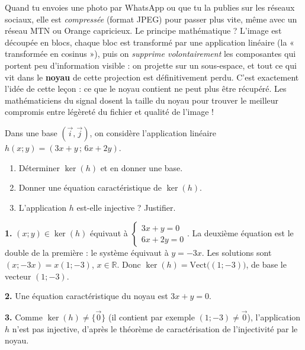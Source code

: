 \documentclass[11pt]{article}
\begin{document}
\begin{savaistu}
Quand tu envoies une photo par WhatsApp ou que tu la publies sur les réseaux sociaux, elle est \emph{compressée} (format JPEG) pour passer plus vite, même avec un réseau MTN ou Orange capricieux. Le principe mathématique ? L'image est découpée en blocs, chaque bloc est transformé par une application linéaire (la « transformée en cosinus »), puis on \emph{supprime volontairement} les composantes qui portent peu d'information visible : on projette sur un sous-espace, et tout ce qui vit dans le \textbf{noyau} de cette projection est définitivement perdu. C'est exactement l'idée de cette leçon : ce que le noyau contient ne peut plus être récupéré. Les mathématiciens du signal dosent la taille du noyau pour trouver le meilleur compromis entre légèreté du fichier et qualité de l'image !
\end{savaistu}

\begin{exercice}
Dans une base $(\vec{i}, \vec{j})$, on considère l'application linéaire $h(x ; y) = (3x + y \,;\, 6x + 2y)$.
\begin{enumerate}
\item Déterminer $\ker(h)$ et en donner une base.
\item Donner une équation caractéristique de $\ker(h)$.
\item L'application $h$ est-elle injective ? Justifier.
\end{enumerate}
\end{exercice}

\begin{corrige}
\textbf{1.} $(x ; y) \in \ker(h)$ équivaut à $\begin{cases} 3x + y = 0 \\ 6x + 2y = 0 \end{cases}$. La deuxième équation est le double de la première : le système équivaut à $y = -3x$. Les solutions sont $(x ; -3x) = x(1 ; -3)$, $x \in \mathbb{R}$. Donc $\ker(h) = \mathrm{Vect}\big((1 ; -3)\big)$, de base le vecteur $(1 ; -3)$.

\textbf{2.} Une équation caractéristique du noyau est $3x + y = 0$.

\textbf{3.} Comme $\ker(h) \neq \{\vec{0}\}$ (il contient par exemple $(1 ; -3) \neq \vec{0}$), l'application $h$ n'est pas injective, d'après le théorème de caractérisation de l'injectivité par le noyau.
\end{corrige}
\end{document}
